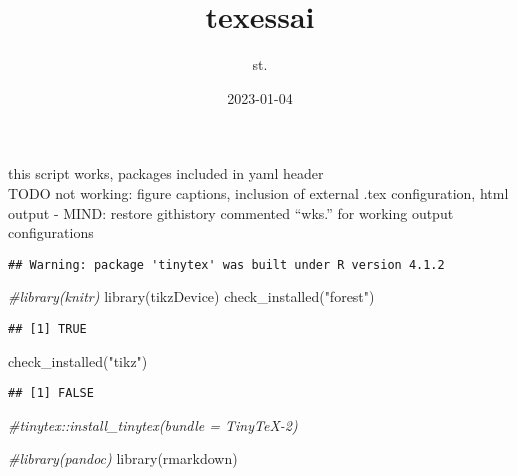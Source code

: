 \documentclass[
]{article}
\title{texessai}
\author{st.}
\date{2023-01-04}
\newenvironment{Shaded}{\begin{snugshade}}{\end{snugshade}}
\newcommand{\AttributeTok}[1]{\textcolor[rgb]{0.77,0.63,0.00}{#1}}
\newcommand{\CommentTok}[1]{\textcolor[rgb]{0.56,0.35,0.01}{\textit{#1}}}
\newcommand{\ConstantTok}[1]{\textcolor[rgb]{0.00,0.00,0.00}{#1}}
\newcommand{\FunctionTok}[1]{\textcolor[rgb]{0.00,0.00,0.00}{#1}}
\newcommand{\NormalTok}[1]{#1}
\newcommand{\SpecialCharTok}[1]{\textcolor[rgb]{0.00,0.00,0.00}{#1}}
\newcommand{\StringTok}[1]{\textcolor[rgb]{0.31,0.60,0.02}{#1}}
\begin{document}
\maketitle

this script works, packages included in yaml header\\
TODO not working: figure captions, inclusion of external .tex
configuration, html output - MIND: restore githistory commented ``wks.''
for working output configurations

\begin{Shaded}
\end{Shaded}

\begin{verbatim}
## Warning: package 'tinytex' was built under R version 4.1.2
\end{verbatim}

\begin{Shaded}
\begin{Highlighting}[]
\CommentTok{\#library(knitr)}
\FunctionTok{library}\NormalTok{(tikzDevice)}
\FunctionTok{check\_installed}\NormalTok{(}\StringTok{"forest"}\NormalTok{)}
\end{Highlighting}
\end{Shaded}

\begin{verbatim}
## [1] TRUE
\end{verbatim}

\begin{Shaded}
\begin{Highlighting}[]
\FunctionTok{check\_installed}\NormalTok{(}\StringTok{"tikz"}\NormalTok{)}
\end{Highlighting}
\end{Shaded}

\begin{verbatim}
## [1] FALSE
\end{verbatim}

\begin{Shaded}
\begin{Highlighting}[]
\CommentTok{\#tinytex::install\_tinytex(bundle = \textquotesingle{}TinyTeX{-}2\textquotesingle{})}

\CommentTok{\#library(pandoc)}
\FunctionTok{library}\NormalTok{(rmarkdown)}
\end{Highlighting}
\end{Shaded}
\end{document}

